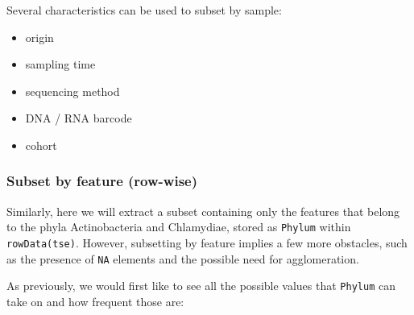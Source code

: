 \documentclass[
]{book}
\newenvironment{Shaded}{\begin{snugshade}}{\end{snugshade}}
\newcommand{\CommentTok}[1]{\textcolor[rgb]{0.56,0.35,0.01}{\textit{#1}}}
\newcommand{\FunctionTok}[1]{\textcolor[rgb]{0.00,0.00,0.00}{#1}}
\newcommand{\NormalTok}[1]{#1}
\newcommand{\SpecialCharTok}[1]{\textcolor[rgb]{0.00,0.00,0.00}{#1}}
\providecommand{\tightlist}{%
  \setlength{\itemsep}{0pt}\setlength{\parskip}{0pt}}
\begin{document}
Several characteristics can be used to subset by sample:

\begin{itemize}
\tightlist
\item
  origin
\item
  sampling time
\item
  sequencing method
\item
  DNA / RNA barcode
\item
  cohort
\end{itemize}

\hypertarget{subset-by-feature-row-wise}{%
\subsubsection{Subset by feature (row-wise)}\label{subset-by-feature-row-wise}}

Similarly, here we will extract a subset containing only the features
that belong to the phyla Actinobacteria and Chlamydiae, stored as
\texttt{Phylum} within \texttt{rowData(tse)}. However, subsetting by feature implies
a few more obstacles, such as the presence of \texttt{NA} elements and the
possible need for agglomeration.

As previously, we would first like to see all the possible values that
\texttt{Phylum} can take on and how frequent those are:

\begin{Shaded}
\end{Shaded}
\end{document}
